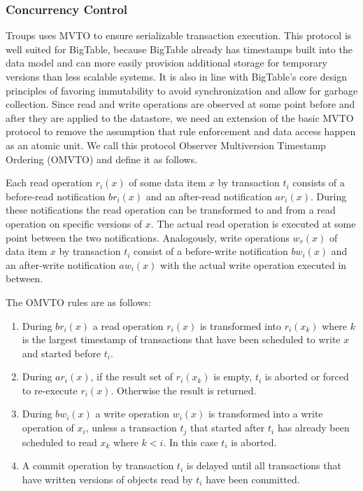 \documentclass[10pt,final,journal]{IEEEtran}
\begin{document}
\subsubsection{Concurrency Control}
Troups uses MVTO to ensure serializable transaction execution. This protocol is well suited for BigTable, because BigTable already has timestamps built into the data model and can more easily provision additional storage for temporary versions than less scalable systems. It is also in line with BigTable's core design principles of favoring immutability to avoid synchronization and allow for garbage collection. Since read and write operations are observed at some point before and after they are applied to the datastore, we need an extension of the basic MVTO protocol to remove the assumption that rule enforcement and data access happen as an atomic unit. We call this protocol Observer Multiversion Timestamp Ordering (OMVTO) and define it as follows.

Each read operation $r_i(x)$ of some data item $x$ by transaction $t_i$ consists of a before-read notification $br_i(x)$ and an after-read notification $ar_i(x)$. During these notifications the read operation can be transformed to and from a read operation on specific versions of $x$. The actual read operation is executed at some point between the two notifications. Analogously,  write operations $w_r(x)$ of data item $x$ by transaction $t_i$ consist of a before-write notification $bw_i(x)$ and an after-write notification $aw_i(x)$ with the actual write operation executed in between.

The OMVTO rules are as follows:
\begin{enumerate}
\item During $br_i(x)$ a read operation $r_i(x)$ is transformed into $r_i(x_k)$ where $k$ is the largest timestamp of transactions that have been scheduled to write $x$ and started before $t_i$.
\item During $ar_i(x)$, if the result set of $r_i(x_k)$ is empty, $t_i$ is aborted or forced to re-execute $r_i(x)$. Otherwise the result is returned.
\item During $bw_i(x)$ a write operation $w_i(x)$ is transformed into a write operation of $x_i$, unless a transaction $t_j$ that started after $t_i$ has already been scheduled to read $x_k$ where $k < i$. In this case $t_i$ is aborted.
\item A commit operation by transaction $t_i$ is delayed until all transactions that have written versions of objects read by $t_i$ have been committed.
\end{enumerate}
\end{document}
